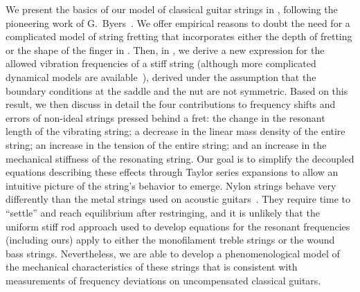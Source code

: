 
We present the basics of our model of classical guitar strings in , following the pioneering work of G.\ Byers~\cite{ref:byers1996cgi,ref:byersweb}. We offer empirical reasons to doubt the need for a complicated model of string fretting that incorporates either the depth of fretting or the shape of the finger in . Then, in , we derive a new expression for the allowed vibration frequencies of a stiff string (although more complicated dynamical models are available~\cite{ref:ducceschi2016lss}), derived  under the assumption that the boundary conditions at the saddle and the nut are not symmetric. Based on this result, we then discuss in detail the four contributions to frequency shifts and errors of non-ideal strings pressed behind a fret: the change in the resonant length of the vibrating string; a decrease in the linear mass density of the entire string; an increase in the tension of the entire string; and an increase in the mechanical stiffness of the resonating string. Our goal is to simplify the decoupled equations describing these effects through Taylor series expansions to allow an intuitive picture of the string's behavior to emerge. Nylon strings behave very differently than the metal strings used on acoustic guitars~\cite{ref:lynchaird2017mpn,ref:lynchaird2018cmp}. They require time to ``settle'' and reach equilibrium after restringing, and it is unlikely that the uniform stiff rod approach used to develop equations for the resonant frequencies (including ours) apply to either the monofilament treble strings or the wound bass strings. Nevertheless, we are able to develop a phenomenological model of the mechanical characteristics of these strings that is consistent with measurements of frequency deviations on uncompensated classical guitars.

